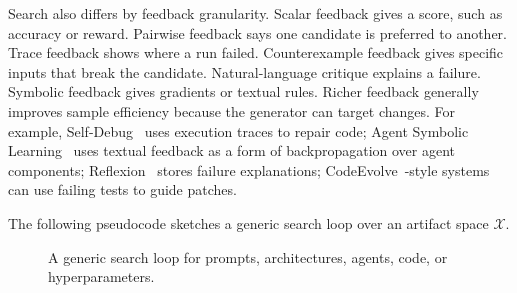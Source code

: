 Search also differs by feedback granularity.  Scalar feedback gives a score, such as accuracy or reward.  Pairwise feedback says one candidate is preferred to another.  Trace feedback shows where a run failed.  Counterexample feedback gives specific inputs that break the candidate.  Natural-language critique explains a failure.  Symbolic feedback gives gradients or textual rules.  Richer feedback generally improves sample efficiency because the generator can target changes.  For example, Self-Debug~\cite{singh2023selfdebug} uses execution traces to repair code; Agent Symbolic Learning~\cite{agentsymboliclearning2024} uses textual feedback as a form of backpropagation over agent components; Reflexion~\cite{reflexion2023} stores failure explanations; CodeEvolve~\cite{codeevolve2024}-style systems can use failing tests to guide patches.

The following pseudocode sketches a generic search loop over an artifact space $\mathcal{X}$.

\begin{figure}[t]
\centering
{}
\caption{A generic search loop for prompts, architectures, agents, code, or hyperparameters.}
\label{alg:search-loop}
\end{figure}

